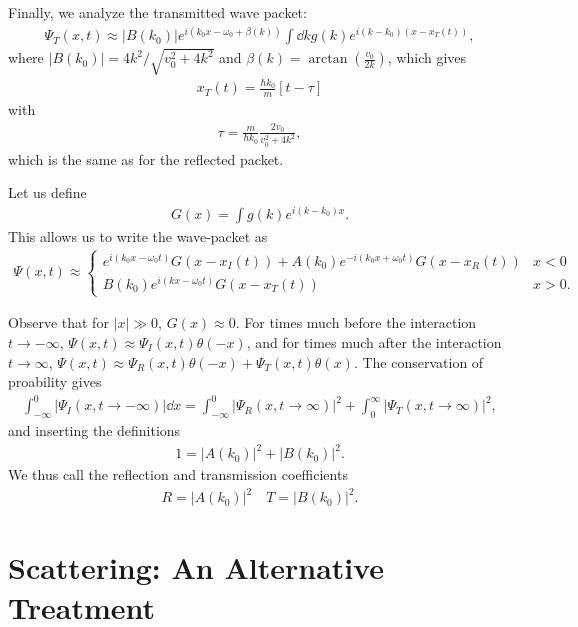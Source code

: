 Finally, we analyze the transmitted wave packet:
\begin{eqnarray}
    \Psi_{T}(x,t) \approx |B(k_0)| e^{i(k_0x - \omega_0 + \beta(k))} \int \dd{k} g(k) e^{i(k - k_0)(x - x_{T}(t))}
,\end{eqnarray}
where $|B(k_0)| = 4k^2/\sqrt{v_0^2 + 4k^2}$ and $\beta(k) = \arctan(\frac{v_0}{2k})$, which gives
\begin{eqnarray}
    x_{T}(t) = \frac{\hbar k_0}{m} [t - \tau ]
\end{eqnarray}
with
\begin{eqnarray}
    \tau = \frac{m}{\hbar k_0} \frac{2v_0}{v_0^2 + 4k^2}
,\end{eqnarray}
which is the same as for the reflected packet.

Let us define
\begin{eqnarray}
    G(x) = \int g(k) e^{i(k-k_0)x}
.\end{eqnarray}
This allows us to write the wave-packet as
\begin{align}
    \Psi(x,t) \approx \begin{cases}
        e^{i(k_0 x - \omega_0 t)} G(x - x_{I}(t)) + A(k_0) e^{-i(k_0x + \omega_0 t)} G(x - x_{R}(t)) & x < 0 \\
        B(k_0) e^{i(kx - \omega_0 t)} G(x - x_{T}(t)) & x > 0
    .\end{cases}
\end{align}

Observe that for $|x| \gg 0$, $G(x) \approx 0$.
For times much before the interaction $t \rightarrow -\infty$, $\Psi(x,t) \approx \Psi_{I}(x,t) \theta(-x)$, and for times much after the interaction $t \rightarrow \infty$, $\Psi(x,t) \approx \Psi_{R}(x,t)\theta(-x) + \Psi_{T}(x,t)\theta(x)$.
The conservation of proability gives
\begin{eqnarray}
    \int_{-\infty}^{0} |\Psi_{I}(x,t \rightarrow -\infty)| \dd{x} = \int_{-\infty}^{0} |\Psi_{R}(x,t\rightarrow \infty)|^2 + \int_{0}^{\infty} |\Psi_{T}(x,t \rightarrow \infty)|^2
,\end{eqnarray}
and inserting the definitions
\begin{eqnarray}
    1 = |A(k_0)|^2 + |B(k_0)|^2
.\end{eqnarray}
We thus call the reflection and transmission coefficients
\begin{eqnarray}
    R = |A(k_0)|^2 \quad T = |B(k_0)|^2
.\end{eqnarray}


\section{Scattering: An Alternative Treatment}

